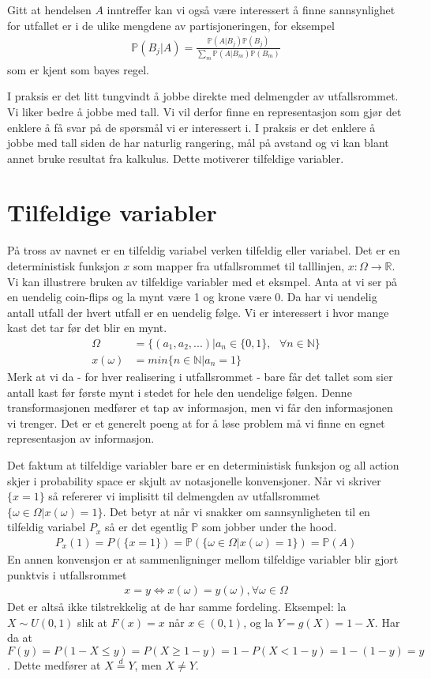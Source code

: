Gitt at hendelsen $A$ inntreffer kan vi også være interessert å finne sannsynlighet for utfallet er i de ulike mengdene av partisjoneringen, for eksempel
\begin{align}
\mathbb{P}(B_j|A) = \frac{\mathbb{P}(A|B_j)\mathbb{P}(B_j)}{\sum_m \mathbb{P}(A|B_m)\mathbb{P}(B_m)}
\end{align}
som er kjent som bayes regel.

I praksis er det litt tungvindt å jobbe direkte med delmengder av utfallsrommet. Vi liker bedre å jobbe med tall. Vi vil derfor finne en representasjon som gjør det enklere å få svar på de spørsmål vi er interessert i. I praksis er det enklere å jobbe med tall siden de har naturlig rangering, mål på avstand og vi kan blant annet bruke resultat fra kalkulus. Dette motiverer tilfeldige variabler.
\section{Tilfeldige variabler}
På tross av navnet er en tilfeldig variabel verken tilfeldig eller variabel. Det er en deterministisk funksjon $x$ som mapper fra utfallsrommet til talllinjen, $x:\Omega \rightarrow \mathbb{R}$. Vi kan illustrere bruken av tilfeldige variabler med et eksmpel. Anta at vi ser på en uendelig coin-flips og la mynt være 1 og krone være 0. Da har vi uendelig antall utfall der hvert utfall er en uendelig følge. Vi er interessert i hvor mange kast det tar før det blir en mynt.
\begin{align}
\Omega &= \{(a_1,a_2,...)|a_n \in \{0,1\},\text{ } \forall n \in \mathbb{N}\} \\
x(\omega) &= min \{n \in \mathbb{N}|a_n = 1\}
\end{align}
Merk at vi da - for hver realisering i utfallsrommet - bare får det tallet som sier antall kast før første mynt i stedet for hele den uendelige følgen. Denne transformasjonen medfører et tap av informasjon, men vi får den informasjonen vi trenger. Det er et generelt poeng at for å løse problem må vi finne en egnet representasjon av informasjon. 

Det faktum at tilfeldige variabler bare er en deterministisk funksjon og all action skjer i probability space er skjult av notasjonelle konvensjoner. Når vi skriver $\{x=1\}$ så refererer vi implisitt til delmengden av utfallsrommet $\{\omega \in \Omega | x(\omega) =1\}$. Det betyr at når vi snakker om sannsynligheten til en tilfeldig variabel $P_x$ så er det egentlig $\mathbb{P}$ som jobber under the hood.
\begin{align}
P_x(1) = P(\{x=1\}) = \mathbb{P}(\{\omega \in \Omega | x(\omega) =1\}) = \mathbb{P}(A)
\end{align}
En annen konvensjon er at sammenligninger mellom tilfeldige variabler blir gjort punktvis i utfallsrommet
\begin{align}
x=y \iff x(\omega) = y(\omega), \forall \omega \in \Omega
\end{align}
Det er altså ikke tilstrekkelig at de har samme fordeling. Eksempel: la $X\sim U(0,1)$ slik at $F(x)=x$ når $x \in (0,1)$, og la $Y = g(X) = 1-X$. Har da at $F(y) = P(1-X\leq y) = P(X \geq 1-y) = 1- P(X < 1-y) = 1-(1-y) = y$. Dette medfører at $X \overset{d}{=}Y$, men $X \neq Y$. 

